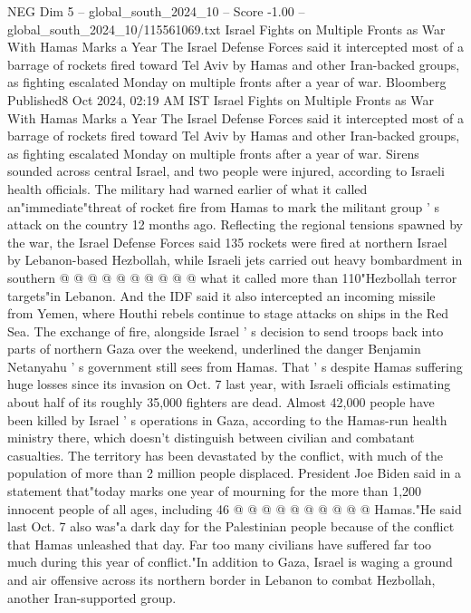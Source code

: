 \begin{textsample}{NEG Dim 5 – global\_south\_2024\_10 – Score -1.00 – global\_south\_2024\_10/115561069.txt}  \label{ex:f5_neg_133}
Israel Fights on Multiple Fronts as War With Hamas Marks a Year The Israel Defense Forces said it intercepted most of a barrage of rockets fired toward Tel Aviv by Hamas and other Iran-backed groups, as fighting escalated Monday on multiple fronts after a year of war.
Bloomberg Published8 Oct 2024, 02:19 AM IST Israel Fights on Multiple Fronts as War With Hamas Marks a Year The Israel Defense Forces said it intercepted most of a barrage of rockets fired toward Tel Aviv by Hamas and other Iran-backed groups, as fighting escalated Monday on multiple fronts after a year of war.
Sirens sounded across central Israel, and two people were injured, according to Israeli health officials.
The military had warned earlier of what it called an"immediate"threat of rocket fire from Hamas to mark the militant group ' s attack on the country 12 months ago.
Reflecting the regional tensions spawned by the war, the Israel Defense Forces said 135 rockets were fired at northern Israel by Lebanon-based Hezbollah, while Israeli jets carried out heavy bombardment in southern @ @ @ @ @ @ @ @ @ @ what it called more than 110"Hezbollah terror targets"in Lebanon.
And the IDF said it also intercepted an incoming missile from Yemen, where Houthi rebels continue to stage attacks on ships in the Red Sea.
The exchange of fire, alongside Israel ' s decision to send troops back into parts of northern Gaza over the weekend, underlined the danger Benjamin Netanyahu ' s government still sees from Hamas.
That ' s despite Hamas suffering huge losses since its invasion on Oct. 7 last year, with Israeli officials estimating about half of its roughly 35,000 fighters are dead.
Almost 42,000 people have been killed by Israel ' s operations in Gaza, according to the Hamas-run health ministry there, which doesn't distinguish between civilian and combatant casualties.
The territory has been devastated by the conflict, with much of the population of more than 2 million people displaced.
President Joe Biden said in a statement that"today marks one year of mourning for the more than 1,200 innocent people of all ages, including 46 @ @ @ @ @ @ @ @ @ @ Hamas."He said last Oct. 7 also was"a dark day for the Palestinian people because of the conflict that Hamas unleashed that day.
Far too many civilians have suffered far too much during this year of conflict."In addition to Gaza, Israel is waging a ground and air offensive across its northern border in Lebanon to combat Hezbollah, another Iran-supported group.

\end{textsample}
